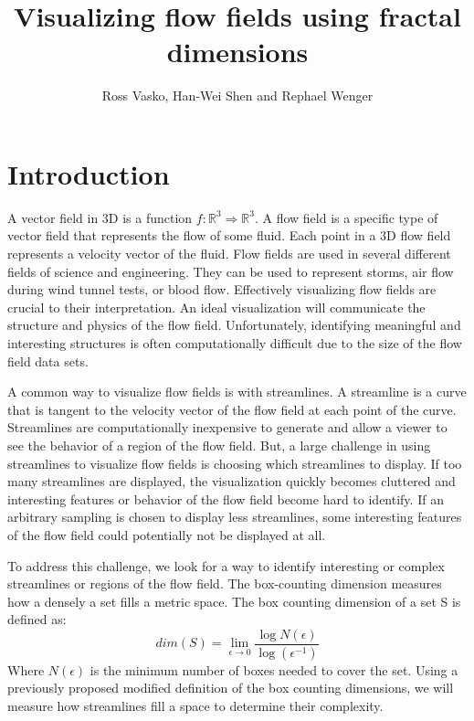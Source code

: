 \documentclass[journal]{vgtc}                %
\title{Visualizing flow fields using fractal dimensions}
\author{Ross Vasko, Han-Wei Shen and Rephael Wenger}
\newcommand {\emath}[1]  {\ensuremath{#1}}
\newcommand {\Real}[1]   {\emath{\mathbb{R}^{#1}}}   %
\newcommand {\Rthree}    {\Real{3}}                  %
\begin{document}
\maketitle

\section{Introduction}

A vector field in 3D is a function $f: \Rthree \Rightarrow \Rthree$.
A flow field is a specific type of vector field that represents the flow of some fluid.
Each point in a 3D flow field represents a velocity vector of the fluid.
Flow fields are used in several different fields of science and engineering.
They can be used to represent storms, air flow during wind tunnel tests, or blood flow.
Effectively visualizing flow fields are crucial to their interpretation.
An ideal visualization will communicate the structure and physics of the flow field.
Unfortunately, identifying meaningful and interesting structures is often computationally difficult due to the size of the flow field data sets.

A common way to visualize flow fields is with streamlines.
A streamline is a curve that is tangent to the velocity vector of the flow field at each point of the curve.
Streamlines are computationally inexpensive to generate and allow a viewer to see the behavior of a region of the flow field.
But, a large challenge in using streamlines to visualize flow fields is choosing which streamlines to display.
If too many streamlines are displayed, the visualization quickly becomes cluttered and interesting features or behavior of the flow field become hard to identify.
If an arbitrary sampling is chosen to display less streamlines, some interesting features of the flow field could potentially not be displayed at all.

To address this challenge, we look for a way to identify interesting or complex streamlines or regions of the flow field.
The box-counting dimension measures how a densely a set fills a metric space.
The box counting dimension of a set S is defined as:
\begin{equation} dim(S) = \lim_{\epsilon \to 0}  \frac{\log N(\epsilon)}{\log(\epsilon^{-1})}\end{equation}
Where $N(\epsilon)$ is the minimum number of boxes needed to cover the set.
Using a previously proposed modified definition of the box counting dimensions, we will measure how streamlines fill a space to determine their complexity.
\end{document}

